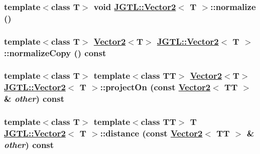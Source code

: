 \hypertarget{class_j_g_t_l_1_1_vector2_6385bd9674fbada72574124565348530}{
\subsubsection[normalize]{\setlength{\rightskip}{0pt plus 5cm}template$<$class T$>$ void \hyperlink{class_j_g_t_l_1_1_vector2}{JGTL::Vector2}$<$ T $>$::normalize ()}}
\label{class_j_g_t_l_1_1_vector2_6385bd9674fbada72574124565348530}


\hypertarget{class_j_g_t_l_1_1_vector2_2b0888b62a1dc291f55f37a83c4e282b}{
\subsubsection[normalizeCopy]{\setlength{\rightskip}{0pt plus 5cm}template$<$class T$>$ \hyperlink{class_j_g_t_l_1_1_vector2}{Vector2}$<$T$>$ \hyperlink{class_j_g_t_l_1_1_vector2}{JGTL::Vector2}$<$ T $>$::normalize\-Copy () const}}
\label{class_j_g_t_l_1_1_vector2_2b0888b62a1dc291f55f37a83c4e282b}


\hypertarget{class_j_g_t_l_1_1_vector2_91d5514ee3166eb6104733922f954c99}{
\subsubsection[projectOn]{\setlength{\rightskip}{0pt plus 5cm}template$<$class T$>$ template$<$class TT$>$ \hyperlink{class_j_g_t_l_1_1_vector2}{Vector2}$<$T$>$ \hyperlink{class_j_g_t_l_1_1_vector2}{JGTL::Vector2}$<$ T $>$::project\-On (const \hyperlink{class_j_g_t_l_1_1_vector2}{Vector2}$<$ TT $>$ \& {\em other}) const}}
\label{class_j_g_t_l_1_1_vector2_91d5514ee3166eb6104733922f954c99}


\hypertarget{class_j_g_t_l_1_1_vector2_52cd99ad87d887272681cd0e4985e3b6}{
\subsubsection[distance]{\setlength{\rightskip}{0pt plus 5cm}template$<$class T$>$ template$<$class TT$>$ T \hyperlink{class_j_g_t_l_1_1_vector2}{JGTL::Vector2}$<$ T $>$::distance (const \hyperlink{class_j_g_t_l_1_1_vector2}{Vector2}$<$ TT $>$ \& {\em other}) const}}
\label{class_j_g_t_l_1_1_vector2_52cd99ad87d887272681cd0e4985e3b6}


